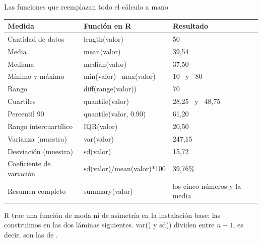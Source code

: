 \documentclass[aspectratio=169,10pt]{beamer}
\newcommand{\fx}[1]{{\ttfamily\color{uniAzul}#1}}
\begin{document}
\begin{frame}{Las funciones que reemplazan todo el cálculo a mano}
  \tiny
  \begin{center}
  \begin{tabular}{@{}p{3.2cm}p{5.0cm}p{3.4cm}@{}}
    \toprule
    \textbf{Medida} & \textbf{Función en R} & \textbf{Resultado} \\
    \midrule
    Cantidad de datos & \fx{length(valor)} & 50 \\
    Media & \fx{mean(valor)} & 39{,}54 \\
    Mediana & \fx{median(valor)} & 37{,}50 \\
    Mínimo y máximo & \fx{min(valor)} \ \fx{max(valor)} & 10 \ y \ 80 \\
    Rango & \fx{diff(range(valor))} & 70 \\
    Cuartiles & \fx{quantile(valor)} & 28{,}25 \ y \ 48{,}75 \\
    Percentil 90 & \fx{quantile(valor, 0.90)} & 61{,}20 \\
    Rango intercuartílico & \fx{IQR(valor)} & 20{,}50 \\
    Varianza (muestra) & \fx{var(valor)} & 247{,}15 \\
    Desviación (muestra) & \fx{sd(valor)} & 15{,}72 \\
    Coeficiente de variación & \fx{sd(valor)/mean(valor)*100} & 39{,}76\% \\
    Resumen completo & \fx{summary(valor)} & los cinco números y la media \\
    \bottomrule
  \end{tabular}
  \end{center}

  \vspace{0.05cm}
  {\tiny\color{uniGris} R  trae una función de moda ni de asimetría en
  la instalación base: las construimos en las dos láminas siguientes.
  \fx{var()} y \fx{sd()} dividen entre $n-1$, es decir, son las de
  .}
\end{frame}
\end{document}
